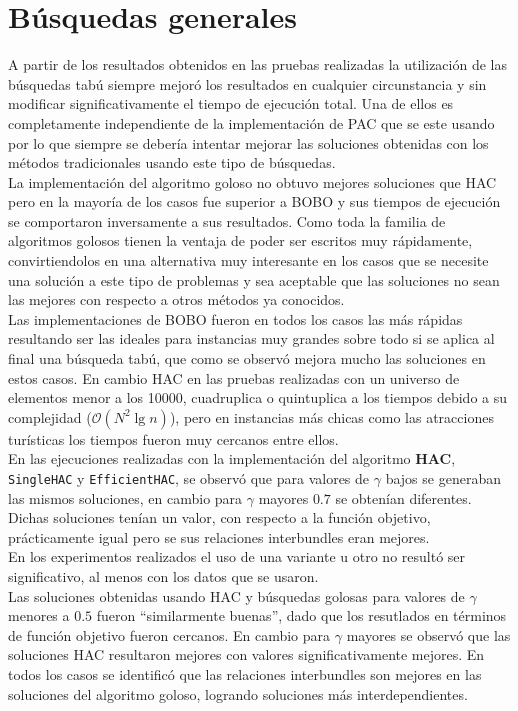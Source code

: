 \section{Búsquedas generales}
A partir de los resultados obtenidos en las pruebas realizadas la utilización de las búsquedas tabú siempre mejoró los resultados en cualquier circunstancia y sin modificar significativamente el tiempo de ejecución total. Una de ellos es completamente independiente de la implementación de PAC que se este usando por lo que siempre se debería intentar mejorar las soluciones obtenidas con los métodos tradicionales usando este tipo de búsquedas.\\
La implementación del algoritmo goloso no obtuvo mejores soluciones que HAC pero en la mayoría de los casos fue superior a BOBO y sus tiempos de ejecución se comportaron inversamente a sus resultados. Como toda la familia de algoritmos golosos tienen la ventaja de poder ser escritos muy rápidamente, convirtiendolos en una alternativa muy interesante en los casos que se necesite una solución a este tipo de problemas y sea aceptable que las soluciones no sean las mejores con respecto a otros métodos ya conocidos.\\
Las implementaciones de BOBO fueron en todos los casos las más rápidas resultando ser las ideales para instancias muy grandes sobre todo si se aplica al final una búsqueda tabú, que como se observó mejora mucho las soluciones en estos casos. En cambio HAC en las pruebas realizadas con un universo de elementos menor a los 10000, cuadruplica o quintuplica a los tiempos debido a su complejidad ($\mathcal{O}(N^{2}\lg n)$), pero en instancias más chicas como las atracciones turísticas los tiempos fueron muy cercanos entre ellos.\\
En las ejecuciones realizadas con la implementación del algoritmo \textbf{HAC}, \texttt{SingleHAC} y \texttt{EfficientHAC}, se observó que para valores de $\gamma$ bajos se generaban las mismos soluciones, en cambio para $\gamma$ mayores $0.7$ se obtenían diferentes. Dichas soluciones tenían un valor, con respecto a la función objetivo, prácticamente igual pero se sus relaciones interbundles eran mejores.\\
En los experimentos realizados el uso de una variante u otro no resultó ser significativo, al menos con los datos que se usaron.\\
Las soluciones obtenidas usando HAC y búsquedas golosas para valores de $\gamma$ menores a $0.5$ fueron \textquotedblleft similarmente buenas\textquotedblright , dado que los resutlados en términos de función objetivo fueron cercanos. En cambio para $\gamma$ mayores se observó que las soluciones HAC resultaron mejores con valores significativamente mejores. En todos los casos se identificó que las relaciones interbundles son mejores en las soluciones del algoritmo goloso, logrando soluciones más interdependientes.

